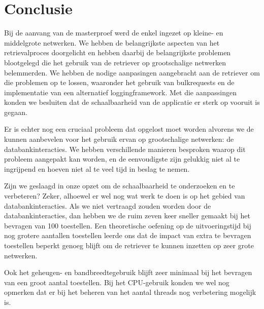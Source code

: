 \chapter*{Conclusie}

Bij de aanvang van de masterproef werd de \nwmretriever{} enkel ingezet op kleine- en middelgrote netwerken.
We hebben de belangrijkste aspecten van het retrievalproces doorgelicht en hebben daarbij de belangrijkste problemen blootgelegd die
het gebruik van de retriever op grootschalige netwerken belemmerden.
We hebben de nodige aanpasingen aangebracht aan de retriever om die problemen op te lossen,
waaronder het gebruik van bulkrequests en de implementatie van een alternatief loggingframework.
Met die aanpassingen konden we besluiten dat de schaalbaarheid van de applicatie er sterk op vooruit is gegaan.

Er is echter nog een cruciaal probleem dat opgelost moet worden alvorens we de \nwmretriever{} kunnen aanbevelen voor het gebruik ervan op grootschalige netwerken:
de databankinteracties.
We hebben verschillende manieren besproken waarop dit probleem aangepakt kan worden,
en de eenvoudigste zijn gelukkig niet al te ingrijpend en hoeven niet al te veel tijd in beslag te nemen.

Zijn we geslaagd in onze opzet om de schaalbaarheid te onderzoeken en te verbeteren?
Zeker, alhoewel er wel nog wat werk te doen is op het gebied van databankinteracties.
Als we niet vertraagd zouden worden door de databankinteracties, dan hebben we de \nwmretriever{} ruim zeven keer sneller gemaakt bij het bevragen van 100 toestellen.
Een theoretische oefening op de uitvoeringstijd bij nog grotere aantallen toestellen leerde ons dat de impact van extra te bevragen toestellen beperkt genoeg blijft
om de retriever te kunnen inzetten op zeer grote netwerken.

Ook het geheugen- en bandbreedtegebruik blijft zeer minimaal bij het bevragen van een groot aantal toestellen.
Bij het CPU-gebruik konden we wel nog opmerken dat er bij het beheren van het aantal threads nog verbetering mogelijk is.


